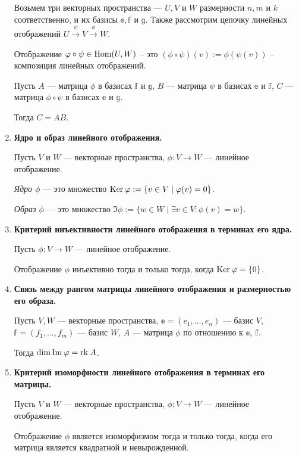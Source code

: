 \begin{enumerate}
Возьмем три векторных пространства --- $U, V$ и $W$ размерности $n, m$ и $k$ соответственно, и их базисы $\mathbb{e}, \mathbb{f}$ и $\mathbb{g}$. Также рассмотрим цепочку линейных отображений $U \xrightarrow{\psi} V \xrightarrow{\phi} W$. 

Отображение $\varphi\circ\psi \in \mathrm{Hom}(U, W)$ -- это $(\phi\circ\psi)(v) := \phi(\psi(v))$ -- композиция линейных отображений.

Пусть $A$ --- матрица $\phi$ в базисах $\mathbb{f}$ и $\mathbb{g}$, $B$ --- матрица $\psi$ в базисах $\mathbb{e}$ и $\mathbb{f}$, $C$ --- матрица $\phi\circ\psi$ в базисах $\mathbb{e}$ и $\mathbb{g}$.

Тогда $C = AB$.

\item \textbf{Ядро и образ линейного отображения.}

Пусть $V$ и $W$ --- векторные пространства, $\phi: V \rightarrow W$ --- линейное отображение.

\textit{Ядро $\phi$} --- это множество $\mathrm{Ker}\:\varphi := \{v \in V \mid \varphi(v) = 0 \}$.

\textit{Образ $\phi$} --- это множество $\Im \phi := \{w \in W \mid \exists v \in V : \phi(v) = w \}$.

\item \textbf{Критерий инъективности линейного отображения в терминах его ядра.}

Пусть $\phi\colon V \rightarrow W$ --- линейное отображение.

Отображение $\phi$ инъективно тогда и только тогда, когда $\mathrm{Ker}\: \varphi = \{0\}$.

\item \textbf{Связь между рангом матрицы линейного отображения и размерностью его образа.}

Пусть $V, W$ --- векторные пространства, $\mathbb{e} = (e_1, \ldots, e_n)$ --- базис $V$, $\mathbb{f} = (f_1, \ldots, f_m)$ --- базис $W$, $A$ --- матрица $\phi$ по отношению к $\mathbb{e},\ \mathbb{f}$.

Тогда $\dim \mathrm{Im\:} \varphi = \mathrm{rk}\: A$.

\item \textbf{Критерий изоморфности линейного отображения в терминах его матрицы.}

Пусть $V$ и $W$ --- векторные пространства, $\phi: V \rightarrow W$ --- линейное отображение.

Отображение $\phi$ является изоморфизмом тогда и только тогда, когда его матрица является квадратной и невырожденной.


\end{enumerate}
